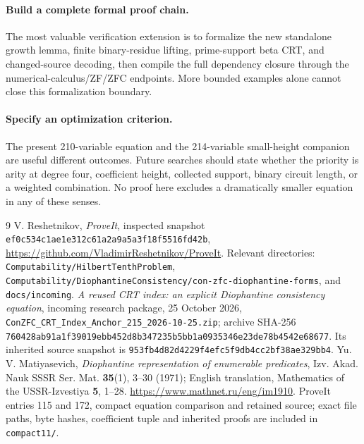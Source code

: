 \documentclass[11pt,a4paper]{article}
\theoremstyle{remark}\newtheorem{remark}[theorem]{Remark}
\begin{document}
\paragraph{Build a complete formal proof chain.}
The most valuable verification extension is to formalize the new standalone
growth lemma, finite binary-residue lifting, prime-support beta CRT, and
changed-source decoding, then compile the full dependency closure through
the numerical-calculus/ZF/ZFC endpoints. More bounded examples alone cannot
close this formalization boundary.

\paragraph{Specify an optimization criterion.}
The present 210-variable equation and the 214-variable small-height companion
are useful different outcomes. Future searches should state whether the
priority is arity at degree four, coefficient height, collected support,
binary circuit length, or a weighted combination. No proof here excludes
a dramatically smaller equation in any of these senses.

\begingroup\raggedright
\begin{thebibliography}{9}
 V. Reshetnikov, \emph{ProveIt}, inspected snapshot
\texttt{ef0c534c1ae1e312c61a2a9a5a3f18f5516fd42b},
\url{https://github.com/VladimirReshetnikov/ProveIt}.
Relevant directories: \texttt{Computability/HilbertTenthProblem},
\texttt{Computability/DiophantineConsistency/con-zfc-diophantine-forms},
and \texttt{docs/incoming}.
 \emph{A reused CRT index: an explicit Diophantine consistency
equation}, incoming research package, 25 October 2026,
\texttt{ConZFC\_CRT\_Index\_Anchor\_215\_2026-10-25.zip};
archive SHA-256 \texttt{760428ab91a1f39019ebb452d8b347235b5bb1a0935346e23de78b4542e68677}.
Its inherited source snapshot is \texttt{953fb4d82d4229f4efc5f9db4cc2bf38ae329bb4}.
 Yu. V. Matiyasevich,
\emph{Diophantine representation of enumerable predicates},
Izv. Akad. Nauk SSSR Ser. Mat. \textbf{35}(1), 3--30 (1971);
English translation, Mathematics of the USSR-Izvestiya \textbf{5}, 1--28.
\url{https://www.mathnet.ru/eng/im1910}.
 ProveIt entries 115 and 172, compact equation
comparison and retained source; exact file paths, byte hashes, coefficient
tuple and inherited proofs are included in \texttt{compact11/}.
\end{thebibliography}
\endgroup

\clearpage
\appendix
\end{document}
